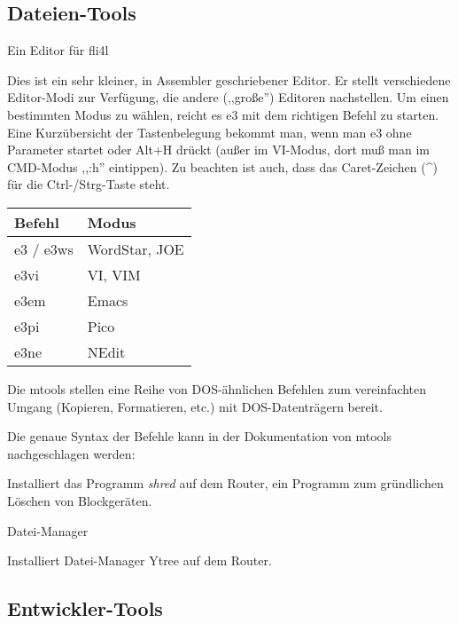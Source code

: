 \subsection{Dateien-Tools}

\begin{description}

 Ein Editor für fli4l

    Dies ist ein sehr kleiner, in Assembler geschriebener Editor. Er stellt
    verschiedene Editor-Modi zur Verfügung, die andere (,,große'') Editoren
    nachstellen. Um einen bestimmten Modus zu wählen, reicht es e3 mit dem
    richtigen Befehl zu starten. Eine Kurzübersicht der Tastenbelegung
    bekommt man, wenn man e3 ohne Parameter startet oder Alt+H drückt (außer
    im VI-Modus, dort muß man im CMD-Modus ,,:h'' eintippen). Zu beachten ist
    auch, dass das Caret-Zeichen (\^{ }) für die Ctrl-/Strg-Taste steht.

    \begin{tabular}{ll}
      Befehl & Modus \\
      \hline
      e3 / e3ws & WordStar, JOE \\
      e3vi      & VI, VIM \\
      e3em      & Emacs \\
      e3pi      & Pico \\
      e3ne      & NEdit
    \end{tabular}

 Die mtools stellen eine Reihe von
     DOS-ähnlichen Befehlen zum vereinfachten Umgang (Kopieren, Formatieren, etc.)
     mit DOS-Datenträgern bereit.

     Die genaue Syntax der Befehle kann in der Dokumentation von mtools
     nachgeschlagen werden:\\


        Installiert das Programm \emph{shred} auf dem Router, ein Programm zum gründlichen Löschen von Blockgeräten.

 Datei-Manager

    Installiert Datei-Manager Ytree auf dem Router.

\end{description}

\subsection {Entwickler-Tools}

